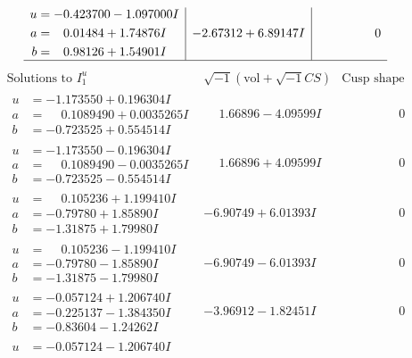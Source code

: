 \documentclass[1p]{elsarticle_modified}
\theoremstyle{definition}
\newcommand{\I}{\sqrt{-1}}
\begin{document}
$$\begin{array}{c|c|c}
\begin{aligned}
u &= -0.423700 - 1.097000 I \\
a &= \phantom{-}0.01484 + 1.74876 I \\
b &= \phantom{-}0.98126 + 1.54901 I\end{aligned}
 & -2.67312 + 6.89147 I & \phantom{-0.000000 } 0\\
 \hline 
 \end{array}$$\newpage$$\begin{array}{c|c|c}  
\text{Solutions to }I^u_{1}& \I (\text{vol} + \sqrt{-1}CS) & \text{Cusp shape}\\
 \hline 
\begin{aligned}
u &= -1.173550 + 0.196304 I \\
a &= \phantom{-}0.1089490 + 0.0035265 I \\
b &= -0.723525 + 0.554514 I\end{aligned}
 & \phantom{-}1.66896 - 4.09599 I & \phantom{-0.000000 } 0 \\ \hline\begin{aligned}
u &= -1.173550 - 0.196304 I \\
a &= \phantom{-}0.1089490 - 0.0035265 I \\
b &= -0.723525 - 0.554514 I\end{aligned}
 & \phantom{-}1.66896 + 4.09599 I & \phantom{-0.000000 } 0 \\ \hline\begin{aligned}
u &= \phantom{-}0.105236 + 1.199410 I \\
a &= -0.79780 + 1.85890 I \\
b &= -1.31875 + 1.79980 I\end{aligned}
 & -6.90749 + 6.01393 I & \phantom{-0.000000 } 0 \\ \hline\begin{aligned}
u &= \phantom{-}0.105236 - 1.199410 I \\
a &= -0.79780 - 1.85890 I \\
b &= -1.31875 - 1.79980 I\end{aligned}
 & -6.90749 - 6.01393 I & \phantom{-0.000000 } 0 \\ \hline\begin{aligned}
u &= -0.057124 + 1.206740 I \\
a &= -0.225137 - 1.384350 I \\
b &= -0.83604 - 1.24262 I\end{aligned}
 & -3.96912 - 1.82451 I & \phantom{-0.000000 } 0 \\ \hline\begin{aligned}
u &= -0.057124 - 1.206740 I \\

\end{aligned}
\end{array}$$
\end{document}
